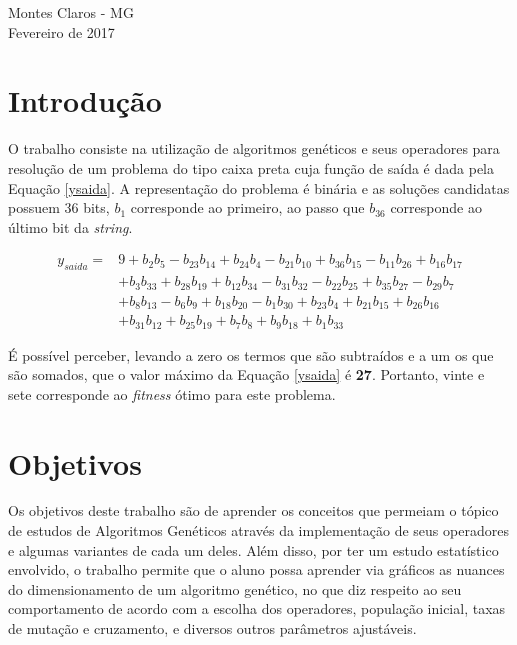 \documentclass[11pt,a4paper]{article}
\begin{document}
\thispagestyle{empty}
\vspace*{\fill}
\begin{center}
Montes Claros - MG\\
Fevereiro de 2017
\end{center}
\newpage

\tableofcontents
\newpage

\section{Introdução}
O trabalho consiste na utilização de algoritmos genéticos e seus operadores para resolução de um problema do tipo caixa preta cuja função de saída é dada pela Equação \ref{ysaida}. A representação do problema é binária e as soluções candidatas possuem 36 bits, $b_{1}$ corresponde ao primeiro, ao passo que $b_{36}$ corresponde ao último bit da \textit{string}.

\begin{equation}
\begin{array}{rl}
y_{saida}=&9+b_{2}b_{5}-b_{23}b_{14}+b_{24}b_{4}-b_{21}b_{10}+b_{36}b_{15}-b_{11}b_{26}+b_{16}b_{17}\\
&+b_{3}b_{33}+b_{28}b_{19}+b_{12}b_{34}-b_{31}b_{32}-b_{22}b_{25}+b_{35}b_{27}-b_{29}b_{7}\\
&+b_{8}b_{13}-b_{6}b_{9}+b_{18}b_{20}-b_{1}b_{30}+b_{23}b_{4}+b_{21}b_{15}+b_{26}b_{16}\\
&+b_{31}b_{12}+b_{25}b_{19}+b_{7}b_{8}+b_{9}b_{18}+b_{1}b_{33}
\end{array}
\label{ysaida}
\end{equation}

É possível perceber, levando a zero os termos que são subtraídos e a um os que são somados, que o valor máximo da Equação \ref{ysaida} é \textbf{27}. Portanto, vinte e sete corresponde ao \textit{fitness} ótimo para este problema.

\section{Objetivos}
Os objetivos deste trabalho são de aprender os conceitos que permeiam o tópico de estudos de Algoritmos Genéticos através da implementação de seus operadores e algumas variantes de cada um deles. Além disso, por ter um estudo estatístico envolvido, o trabalho permite que o aluno possa aprender via gráficos as nuances do dimensionamento de um algoritmo genético, no que diz respeito ao seu comportamento de acordo com a escolha dos operadores, população inicial, taxas de mutação e cruzamento, e diversos outros parâmetros ajustáveis.
\end{document}
